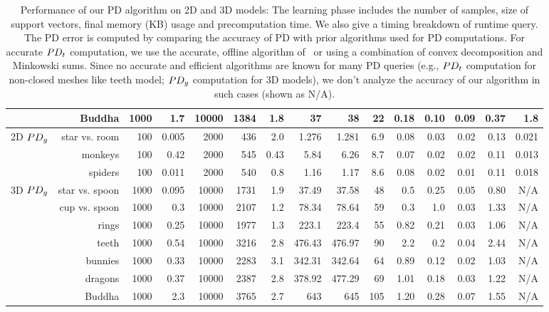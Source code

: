 \begin{table}[tbp]
{\begin{tabular}{|c|r|r|r|r|r|r|r|r|r|r|r|r|r|r|}
    \multicolumn{1}{|c|}{} & Buddha  & 1000  &  1.7 & 10000 & 1384  & 1.8 & 37 & 38 &   22    & 0.18 & 0.10 &  0.09  &  0.37 & 1.8 \\
    \hline \hline
    \multicolumn{1}{|c|}{\multirow{3}{*}{2D $PD_g$}} & star vs. room &  100   & 0.005 & 2000 & 436  & 2.0 & 1.276 & 1.281 &  6.9   & 0.08 & 0.03 &  0.02    & 0.13 & 0.021\\
    \multicolumn{1}{|c|}{} & monkeys & 100 & 0.42   &  2000 & 545   & 0.43 &  5.84 &  6.26 &    8.7    & 0.07 & 0.02  & 0.02  & 0.11 & 0.013 \\
    \multicolumn{1}{|c|}{} & spiders & 100 & 0.011 & 2000   & 540  &  0.8 &  1.16 & 1.17 &   8.6   & 0.08 & 0.02 &   0.01   & 0.11 & 0.018 \\ \hline
    \multicolumn{1}{|c|}{\multirow{3}{*}{3D $PD_g$}} & star vs. spoon &  1000 & 0.095  & 10000  & 1731  & 1.9 & 37.49 & 37.58 &  48   &0.5 & 0.25 &  0.05  & 0.80 & N/A \\
    \multicolumn{1}{|c|}{} & cup vs. spoon & 1000 & 0.3  & 10000   &  2107  & 1.2  &  78.34 & 78.64 &  59   & 0.3& 1.0 & 0.03  &  1.33 & N/A \\
    \multicolumn{1}{|c|}{} & rings & 1000  & 0.25  & 10000   &  1977  &  1.3  &  223.1 & 223.4 &   55    & 0.82 & 0.21 &   0.03  & 1.06 & N/A \\
    \multicolumn{1}{|c|}{} & teeth  & 1000  &  0.54 & 10000 & 3216  & 2.8 & 476.43 & 476.97 &   90      & 2.2 & 0.2 & 0.04  &  2.44 & N/A \\
    \multicolumn{1}{|c|}{} & bunnies  & 1000  &  0.33 & 10000 & 2283  & 3.1 & 342.31 & 342.64 &   64     & 0.89 & 0.12 & 0.02  &  1.03 & N/A \\
    \multicolumn{1}{|c|}{} & dragons  & 1000  &  0.37 & 10000 & 2387  & 2.8 & 378.92 & 477.29 &   69     & 1.01 & 0.18 & 0.03  &  1.22 & N/A \\
    \multicolumn{1}{|c|}{} & Buddha  & 1000  &  2.3 & 10000 & 3765  & 2.7 & 643 & 645 &   105     & 1.20 & 0.28 & 0.07  &  1.55 & N/A \\
    \hline
    \end{tabular}
}
  \caption[Performance of the learning-based PD algorithm on 2D and 3D models]{
Performance of our PD algorithm on 2D and 3D models: The learning phase includes the number of samples, size of support vectors, final memory (KB) usage and precomputation time.
We also give a timing breakdown of runtime query. The PD error is computed by comparing the accuracy of $\overline{\text{PD}}$ with prior algorithms used for PD computations. For accurate $PD_t$ computation, we use the accurate, offline algorithm of~\protect \cite{Lien:2009:ASM} or using a combination of convex decomposition and Minkowski sums.   Since no accurate and efficient algorithms are known for many PD queries (e.g., $PD_t$ computation for non-closed meshes like teeth model; $PD_g$ computation for 3D models), we don't analyze the accuracy of our algorithm in such cases (shown as N/A). }\label{tab:2:learningperformance}
\end{table}













